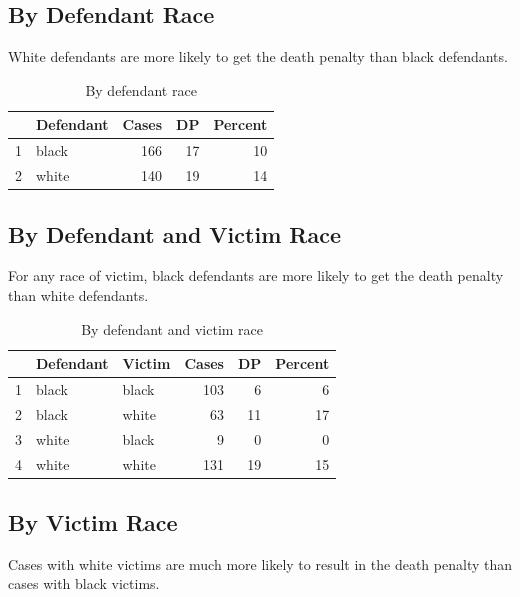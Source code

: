 \documentclass[letterpaper, landscape]{article}
\begin{document}
  \subsection{By Defendant Race}

  White defendants are more likely to get the death penalty than black defendants.

  \begin{table}[H]
    \centering
    \begin{tabular}{rlrrr}
      \toprule
        & Defendant & Cases & DP & Percent \\
      \midrule
      1 & black     & 166   & 17 & 10 \\
      2 & white     & 140   & 19 & 14 \\
      \bottomrule
    \end{tabular}
    \caption{By defendant race}
  \end{table}

  \subsection{By Defendant and Victim Race}

  For any race of victim, black defendants are more likely to get the death penalty than white defendants.

  \begin{table}[H]
    \centering
    \begin{tabular}{rllrrr}
      \toprule
          & Defendant & Victim & Cases & DP & Percent \\
      \midrule
       1  & black     & black  & 103   & 6  & 6 \\
       2  & black     & white  & 63    & 11 & 17 \\
       3  & white     & black  & 9     & 0  & 0 \\
       4  & white     & white  & 131   & 19 & 15 \\
       \bottomrule
    \end{tabular}
    \caption{By defendant and victim race}
  \end{table}

  \subsection{By Victim Race}

  Cases with white victims are much more likely to result in the death penalty
  than cases with black victims.
\end{document}
